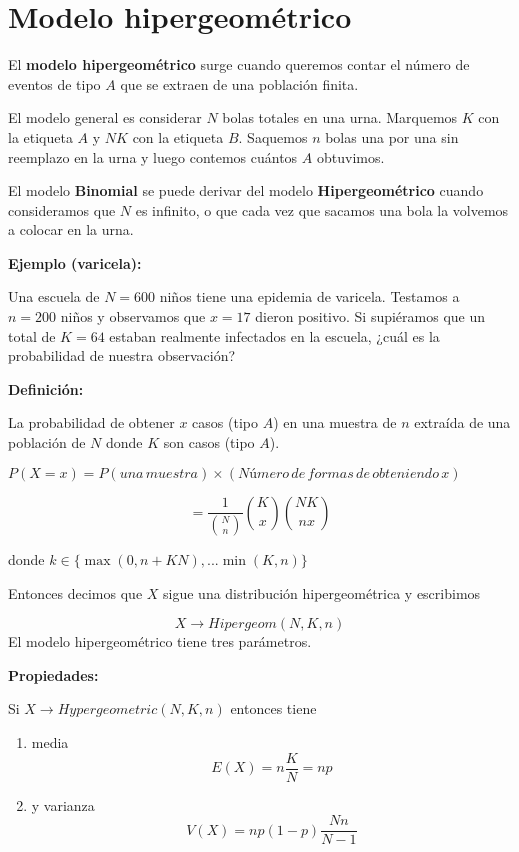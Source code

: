 \documentclass[
]{book}
\begin{document}
\hypertarget{modelo-hipergeomuxe9trico}{%
\section{Modelo hipergeométrico}\label{modelo-hipergeomuxe9trico}}

El \textbf{modelo hipergeométrico} surge cuando queremos contar el número de eventos de tipo \(A\) que se extraen de una población finita.

El modelo general es considerar \(N\) bolas totales en una urna. Marquemos \(K\) con la etiqueta \(A\) y \(NK\) con la etiqueta \(B\). Saquemos \(n\) bolas una por una sin reemplazo en la urna y luego contemos cuántos \(A\) obtuvimos.

El modelo \textbf{Binomial} se puede derivar del modelo \textbf{Hipergeométrico} cuando consideramos que \(N\) es infinito, o que cada vez que sacamos una bola la volvemos a colocar en la urna.

\textbf{Ejemplo (varicela):}

Una escuela de \(N=600\) niños tiene una epidemia de varicela. Testamos a \(n=200\) niños y observamos que \(x=17\) dieron positivo. Si supiéramos que un total de \(K=64\) estaban realmente infectados en la escuela, ¿cuál es la probabilidad de nuestra observación?

\textbf{Definición:}

La probabilidad de obtener \(x\) casos (tipo \(A\)) en una muestra de \(n\) extraída de una población de \(N\) donde \(K\) son casos (tipo \(A\)).

\(P(X=x)=P(una\,muestra) \times (Número\, de\, formas\, de\, obteniendo\, x)\)

\[=\frac{1}{\binom N n}\binom K x \binom {NK} {nx}\]

donde \(k \in \{\max(0, n+KN), ... \min(K, n) \}\)

Entonces decimos que \(X\) sigue una distribución hipergeométrica y escribimos

\[X \rightarrow Hipergeom(N,K,n)\]
El modelo hipergeométrico tiene tres parámetros.

\textbf{Propiedades:}

Si \(X \rightarrow Hypergeometric(N,K,n)\) entonces tiene

\begin{enumerate}
\def\labelenumi{\arabic{enumi})}
\item
  media \[E(X) = n \frac{K}{N} = np\]
\item
  y varianza \[V(X) = np(1-p)\frac{Nn}{N-1}\]
\end{enumerate}
\end{document}
